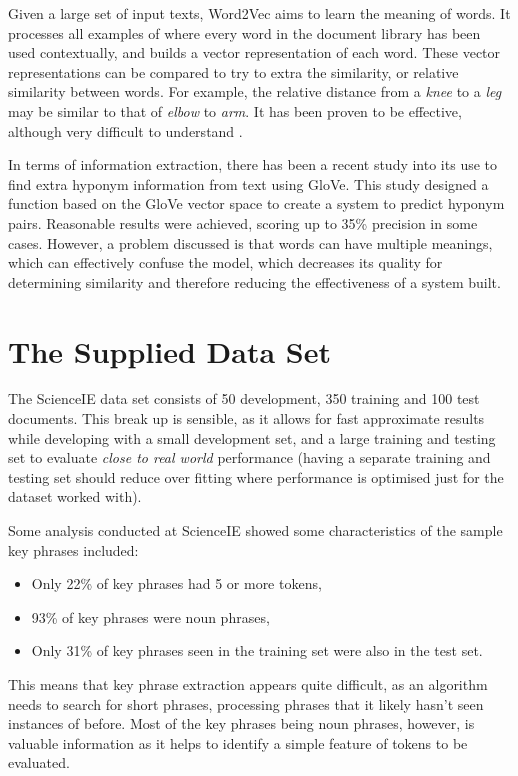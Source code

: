 Given a large set of input texts, Word2Vec aims to learn the meaning of words. It processes all examples of where every word in the document library has been used contextually, and builds a vector representation of each word. These vector representations can be compared to try to extra the similarity, or relative similarity between words. For example, the relative distance from a \textit{knee} to a \textit{leg} may be similar to that of \textit{elbow} to \textit{arm}. It has been proven to be effective, although very difficult to understand \cite{Goldberg2014}. 

In terms of information extraction, there has been a recent study into its use to find extra hyponym information from text \cite{Nayak2015} using GloVe. This study designed a function based on the GloVe vector space to create a system to predict hyponym pairs. Reasonable results were achieved, scoring up to 35\% precision in some cases. However, a problem discussed is that words can have multiple meanings, which can effectively confuse the model, which decreases its quality for determining similarity and therefore reducing the effectiveness of a system built. 

\section{The Supplied Data Set}
The ScienceIE data set consists of 50 development, 350 training and 100 test documents. This break up is sensible, as it allows for fast approximate results while developing with a small development set, and a large training and testing set to evaluate \textit{close to real world} performance (having a separate training and testing set should reduce over fitting where performance is optimised just for the dataset worked with).

Some analysis conducted at ScienceIE \cite{Augenstein2017} showed some characteristics of the sample key phrases included:
\begin{itemize}
	\item Only 22\% of key phrases had 5 or more tokens,
	\item 93\% of key phrases were noun phrases,
	\item Only 31\% of key phrases seen in the training set were also in the test set.
\end{itemize}

This means that key phrase extraction appears quite difficult, as an algorithm needs to search for short phrases, processing phrases that it likely hasn't seen instances of before. Most of the key phrases being noun phrases, however, is valuable information as it helps to identify a simple feature of tokens to be evaluated.

